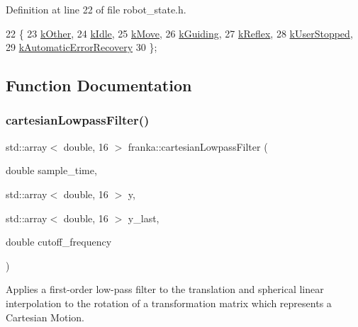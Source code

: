Definition at line 22 of file robot\+\_\+state.\+h.


\begin{DoxyCode}
22                      \{
23   \hyperlink{namespacetesting_1_1internal_aa8747bda20137c9aa7f846dee830e686ad47f29150ab7a9ec8ce2491f44537347}{kOther},
24   \hyperlink{namespaceresearch__interface_1_1robot_abd2451eb963a1843f1eb066ebd4b06e8af5137a026a4b2f3b1c8a21cfc60dd14b}{kIdle},
25   \hyperlink{namespaceresearch__interface_1_1gripper_adeda0327764e059bac8a5f967ce41590ae54c7412401b5e36c1c254e6fb17a3dd}{kMove},
26   \hyperlink{namespaceresearch__interface_1_1robot_a9d089d8f41640bff616c6d4c69ae5c37a3f62c59dc456d870c5232af7b73944ea}{kGuiding},
27   \hyperlink{namespaceresearch__interface_1_1robot_a9d089d8f41640bff616c6d4c69ae5c37a24a5ddd7430a2592185005fce3881f62}{kReflex},
28   \hyperlink{namespaceresearch__interface_1_1robot_a9d089d8f41640bff616c6d4c69ae5c37aaef321f1c9c879b98c2bcd307ad2305f}{kUserStopped},
29   \hyperlink{namespaceresearch__interface_1_1robot_a9d089d8f41640bff616c6d4c69ae5c37ab37e3f1dba8351f3745083064998b35f}{kAutomaticErrorRecovery}
30 \};
\end{DoxyCode}


\subsection{Function Documentation}
\mbox{\label{namespacefranka_a7c9b0bec78181cabee7466bc136996e6}} 
\subsubsection{\texorpdfstring{cartesian\+Lowpass\+Filter()}{cartesianLowpassFilter()}}
{\footnotesize\ttfamily std\+::array$<$ double, 16 $>$ franka\+::cartesian\+Lowpass\+Filter (\begin{DoxyParamCaption}\item[{double}]{sample\+\_\+time,  }\item[{std\+::array$<$ double, 16 $>$}]{y,  }\item[{std\+::array$<$ double, 16 $>$}]{y\+\_\+last,  }\item[{double}]{cutoff\+\_\+frequency }\end{DoxyParamCaption})}

Applies a first-\/order low-\/pass filter to the translation and spherical linear interpolation to the rotation of a transformation matrix which represents a Cartesian Motion.


